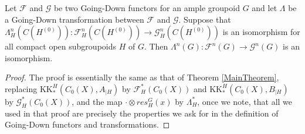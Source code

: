 	\begin{satz}\label{Theorem:Going-Down Theorem}
		Let $\mathcal{F}$ and $\mathcal{G}$ be two Going-Down functors for an ample groupoid $G$ and let $\Lambda$ be a Going-Down transformation between $\mathcal{F}$ and $\mathcal{G}$. Suppose that $\Lambda_H^n(C(H^{(0)})):\mathcal{F}_H^n(C(H^{(0)}))\rightarrow\mathcal{G}_H^n(C(H^{(0)}))$ is an isomorphism for all compact open subgroupoids $H$ of $G$. Then $\Lambda^n(G):\mathcal{F}^n(G)\rightarrow\mathcal{G}^n(G)$ is an isomorphism.
	\end{satz}
	\begin{proof} The proof is essentially the same as that of Theorem \ref{MainTheorem}, replacing $\mathrm{KK}^H_*(C_0(X),A_{\mid H})$ by $\mathcal{F}^*_H(C_0(X))$ and $\mathrm{KK}^H_*(C_0(X),B_{\mid H})$ by $\mathcal{G}^*_H(C_0(X))$, and the map $\cdot \otimes res_H^G(x)$ by $\Lambda_H^*$, once we note, that all we used in that proof are precisely the properties we ask for in the definition of Going-Down functors and transformations.
	\end{proof}
	